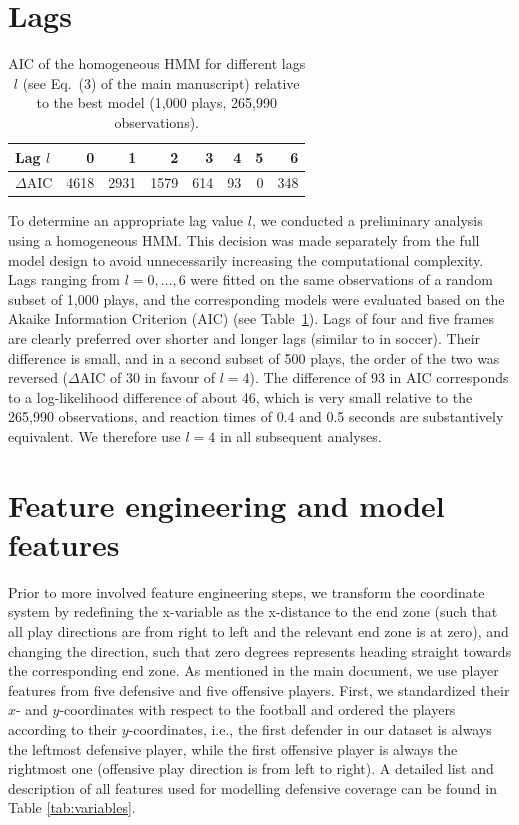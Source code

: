 \documentclass[namedate,webpdf,modern,medium]{oup-authoring-template}
\begin{document}
\section{Lags}
\begin{table}[ht]
\centering
\caption{AIC of the homogeneous HMM for different lags $l$ (see Eq.~(3) of the main manuscript) relative to the best model (1,000 plays, 265,990 observations).}
\label{fig:lags}
\begin{tabular}{lrrrrrrr}
\hline
Lag $l$ & 0 & 1 & 2 & 3 & 4 & 5 & 6 \\
\hline
$\Delta$AIC & 4618 & 2931 & 1579 & 614 & 93 & 0 & 348 \\
\hline
\end{tabular}
\end{table}

To determine an appropriate lag value $l$, we conducted a preliminary analysis using a homogeneous HMM. This decision was made separately from the full model design to avoid unnecessarily increasing the computational complexity. Lags ranging from $l=0, \ldots, 6$ were fitted on the same observations of a random subset of 1,000 plays, and the corresponding models were evaluated based on the Akaike Information Criterion (AIC) (see Table~\ref{fig:lags}). Lags of four and five frames are clearly preferred over shorter and longer lags (similar to \citealp{wu2023evaluation} in soccer). Their difference is small, and in a second subset of 500 plays, the order of the two was reversed ($\Delta$AIC of 30 in favour of $l=4$). The difference of 93 in AIC corresponds to a log-likelihood difference of about 46, which is very small relative to the 265,990 observations, and reaction times of 0.4 and 0.5 seconds are substantively equivalent. We therefore use $l=4$ in all subsequent analyses.

\section{Feature engineering and model features}
\label{app:features}

Prior to more involved feature engineering steps, we transform the coordinate system by redefining the x-variable as the x-distance to the end zone (such that all play directions are from right to left and the relevant end zone is at zero), and changing the direction, such that zero degrees represents heading straight towards the corresponding end zone. As mentioned in the main document, we use player features from five defensive and five offensive players. First, we standardized their $x$- and $y$-coordinates with respect to the football and ordered the players according to their $y$-coordinates, i.e., the first defender in our dataset is always the leftmost defensive player, while the first offensive player is always the rightmost one (offensive play direction is from left to right). A detailed list and description of all features used for modelling defensive coverage can be found in Table \ref{tab:variables}. %
\end{document}
